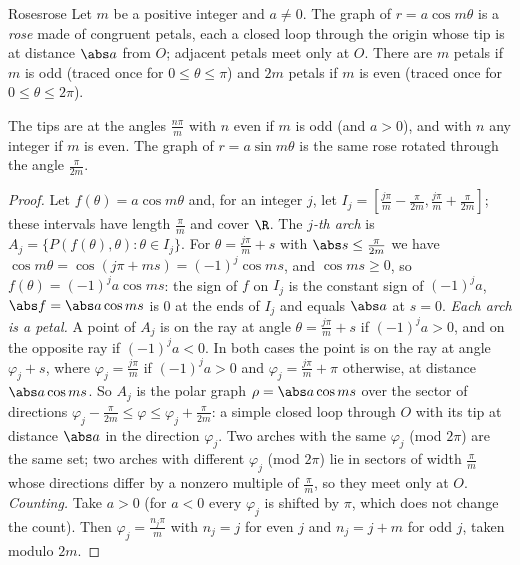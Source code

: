 \documentclass[11pt]{article}
\begin{document}
\begin{thm}{Roses}{rose}
Let $m$ be a positive integer and $a\ne0$. The graph of $r=a\cos m\theta$ is a \emph{rose} made of congruent petals, each a closed loop through the origin whose tip is at distance $\abs a$ from $O$; adjacent petals meet only at $O$. There are $m$ petals if $m$ is odd (traced once for $0\le\theta\le\pi$) and $2m$ petals if $m$ is even (traced once for $0\le\theta\le2\pi$).

The tips are at the angles $\frac{n\pi}m$ with $n$ even if $m$ is odd (and $a>0$), and with $n$ any integer if $m$ is even. The graph of $r=a\sin m\theta$ is the same rose rotated through the angle $\frac\pi{2m}$.
\end{thm}
\begin{proof}
Let $f(\theta)=a\cos m\theta$ and, for an integer $j$, let $I_j=\left[\frac{j\pi}m-\frac\pi{2m},\frac{j\pi}m+\frac\pi{2m}\right]$; these intervals have length $\frac\pi m$ and cover $\R$. The \emph{$j$-th arch} is $A_j=\{P(f(\theta),\theta):\theta\in I_j\}$. For $\theta=\frac{j\pi}m+s$ with $\abs s\le\frac\pi{2m}$ we have $\cos m\theta=\cos(j\pi+ms)=(-1)^j\cos ms$, and $\cos ms\ge0$, so $f(\theta)=(-1)^ja\cos ms$: the sign of $f$ on $I_j$ is the constant sign of $(-1)^ja$, $\abs f=\abs a\cos ms$ is $0$ at the ends of $I_j$ and equals $\abs a$ at $s=0$.
\emph{Each arch is a petal.} A point of $A_j$ is on the ray at angle $\theta=\frac{j\pi}m+s$ if $(-1)^ja>0$, and on the opposite ray if $(-1)^ja<0$. In both cases the point is on the ray at angle $\varphi_j+s$, where $\varphi_j=\frac{j\pi}m$ if $(-1)^ja>0$ and $\varphi_j=\frac{j\pi}m+\pi$ otherwise, at distance $\abs a\cos ms$. So $A_j$ is the polar graph $\rho=\abs a\cos ms$ over the sector of directions $\varphi_j-\frac\pi{2m}\le\varphi\le\varphi_j+\frac\pi{2m}$: a simple closed loop through $O$ with its tip at distance $\abs a$ in the direction $\varphi_j$. Two arches with the same $\varphi_j$ (mod $2\pi$) are the same set; two arches with different $\varphi_j$ (mod $2\pi$) lie in sectors of width $\frac\pi m$ whose directions differ by a nonzero multiple of $\frac\pi m$, so they meet only at $O$.
\emph{Counting.} Take $a>0$ (for $a<0$ every $\varphi_j$ is shifted by $\pi$, which does not change the count). Then $\varphi_j=\frac{n_j\pi}m$ with $n_j=j$ for even $j$ and $n_j=j+m$ for odd $j$, taken modulo $2m$.

\end{proof}
\end{document}
